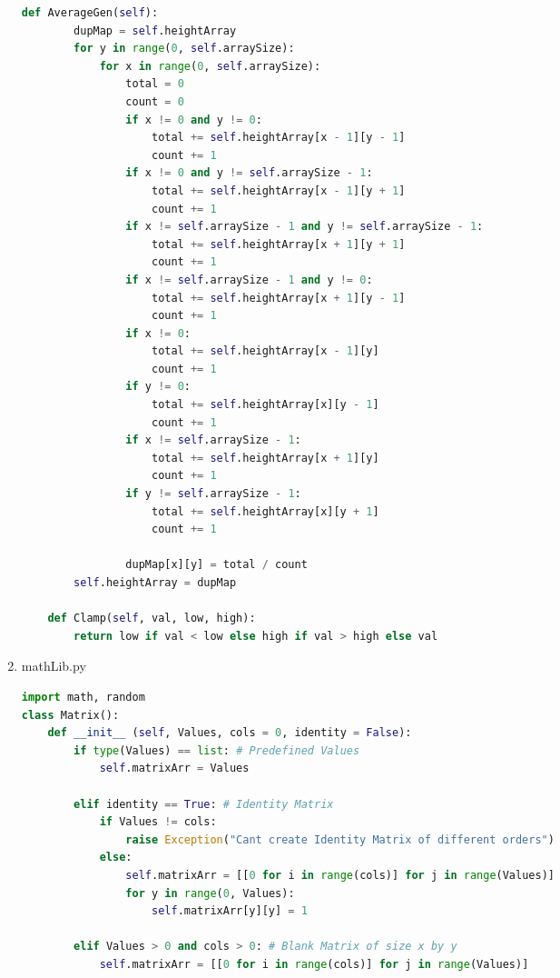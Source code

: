 \begin{flushleft}
\begin{enumerate}
\begin{lstlisting}[language=Python]
    def AverageGen(self):
        dupMap = self.heightArray
        for y in range(0, self.arraySize):
            for x in range(0, self.arraySize):        
                total = 0
                count = 0
                if x != 0 and y != 0:
                    total += self.heightArray[x - 1][y - 1]
                    count += 1
                if x != 0 and y != self.arraySize - 1:
                    total += self.heightArray[x - 1][y + 1]
                    count += 1
                if x != self.arraySize - 1 and y != self.arraySize - 1:
                    total += self.heightArray[x + 1][y + 1]
                    count += 1
                if x != self.arraySize - 1 and y != 0:
                    total += self.heightArray[x + 1][y - 1]
                    count += 1
                if x != 0:
                    total += self.heightArray[x - 1][y]
                    count += 1
                if y != 0:
                    total += self.heightArray[x][y - 1]
                    count += 1
                if x != self.arraySize - 1:
                    total += self.heightArray[x + 1][y]
                    count += 1
                if y != self.arraySize - 1:
                    total += self.heightArray[x][y + 1]
                    count += 1

                dupMap[x][y] = total / count
        self.heightArray = dupMap

    def Clamp(self, val, low, high):
        return low if val < low else high if val > high else val
        \end{lstlisting}
        
    \item mathLib.py
        \begin{lstlisting}[language=Python]
import math, random
class Matrix():
    def __init__ (self, Values, cols = 0, identity = False):
        if type(Values) == list: # Predefined Values
            self.matrixArr = Values
            
        elif identity == True: # Identity Matrix
            if Values != cols:
                raise Exception("Cant create Identity Matrix of different orders")
            else:
                self.matrixArr = [[0 for i in range(cols)] for j in range(Values)]
                for y in range(0, Values):
                    self.matrixArr[y][y] = 1

        elif Values > 0 and cols > 0: # Blank Matrix of size x by y
            self.matrixArr = [[0 for i in range(cols)] for j in range(Values)]


\end{lstlisting}
\end{enumerate}
\end{flushleft}
